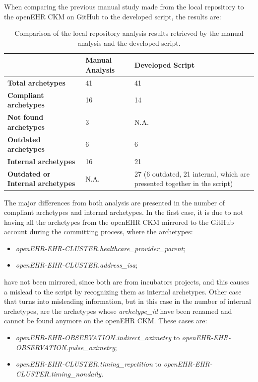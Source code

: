 \documentclass[mim_thesis.tex]{subfiles}
\begin{document}
When comparing the previous manual study made from the local repository to the openEHR CKM on GitHub to the developed script, the results are:

\begin{table}[H]
\centering
\caption{Comparison of the local repository analysis results retrieved by the manual analysis and the developed script. }
\label{tab:comp_manual_script}
\begin{tabular}{p{6cm} p{3cm} p{6.5cm}}
\toprule[2pt]
\textbf{ } & \textbf{Manual Analysis} & \textbf{Developed Script} \\ \midrule[2pt]
\textbf{Total archetypes}  & 41 & 41 \\ \midrule
\textbf{Compliant archetypes} & 16 & 14 \\ \midrule
\textbf{Not found archetypes} & 3 & N.A. \\ \midrule
\textbf{Outdated archetypes} & 6 & 6 \\ \midrule
\textbf{Internal archetypes} & 16 & 21 \\ \midrule
\textbf{Outdated or Internal archetypes} & N.A. & 27 (6 outdated, 21 internal, which are presented together in the script)
\\ \bottomrule[2pt]
\end{tabular}
\end{table}

The major differences from both analysis are presented in the number of compliant archetypes and internal archetypes. In the first case, it is due to not having all the archetypes from the openEHR CKM mirrored to the GitHub account during the committing process, where the archetypes:

\begin{itemize}[noitemsep]
\item \textit{openEHR-EHR-CLUSTER.healthcare\_provider\_parent};
\item \textit{openEHR-EHR-CLUSTER.address\_isa};
\end{itemize}

have not been mirrored, since both are from incubators projects, and this causes a mislead to the script by recognizing them as internal archetypes. Other case that turns into misleading information, but in this case in the number of internal archetypes, are the archetypes whose \textit{archetype\_id} have been renamed and cannot be found anymore on the openEHR CKM. These cases are:

\begin{itemize}[noitemsep]
\item \textit{openEHR-EHR-OBSERVATION.indirect\_oximetry} to \textit{openEHR-EHR-OBSERVATION.pulse\_oximetry};
\item \textit{openEHR-EHR-CLUSTER.timing\_repetition} to \textit{openEHR-EHR-CLUSTER.timing\_nondaily}.
\end{itemize}
\end{document}
